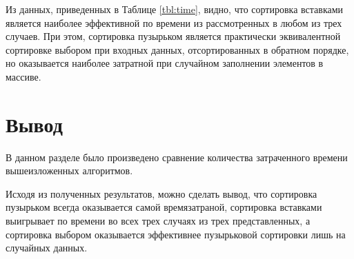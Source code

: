 Из данных, приведенных в  Таблице \ref{tbl:time}, видно, что сортировка вставками является наиболее эффективной по времени из рассмотренных в любом из трех случаев. При этом, сортировка пузырьком является практически эквивалентной сортировке выбором при входных данных, отсортированных в обратном порядке, но оказывается наиболее затратной при случайном заполнении элементов в массиве.


\section{Вывод}

В данном разделе было произведено сравнение количества затраченного времени вышеизложенных алгоритмов.

Исходя из полученных результатов, можно сделать вывод, что сортировка пузырьком всегда оказывается самой времязатраной, сортировка вставками выигрывает по времени во всех трех случаях из трех представленных, а сортировка выбором оказывается эффективнее пузырьковой сортировки лишь на случайных данных.
